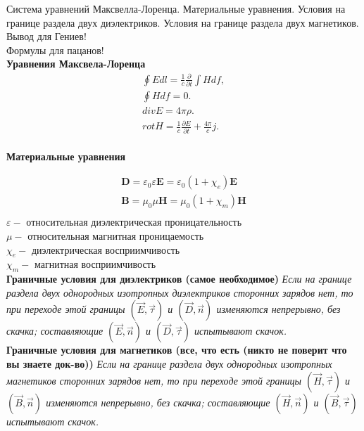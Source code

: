 \documentclass[__main__.tex]{subfiles}
\begin{document}
Система уравнений Максвелла-Лоренца. Материальные уравнения. Условия на границе раздела двух диэлектриков. Условия на границе раздела двух магнетиков.\\ 

Вывод для Гениев!\\
Формулы для пацанов!\\

\textbf{Уравнения Максвела-Лоренца}
\begin{gather*}
\oint Edl = \frac{1}{c}\frac{\partial}{\partial t}\int Hdf,\\
\oint H df = 0.\\
div E = 4\pi\rho.\\
rot H = \frac{1}{c}\frac{\partial E}{\partial t} + \frac{4\pi}{c}j.\\
\end{gather*}

\textbf{Материальные уравнения}

\begin{gather*}
\mathbf {D} =\varepsilon _{0}\varepsilon \mathbf {E} =\varepsilon _{0}(1+\chi _{e})\mathbf {E} \\
\mathbf {B} =\mu _{0}\mu \mathbf {H} =\mu _{0}(1+\chi _{m})\mathbf {H} \\
\end{gather*}
$\varepsilon-$ относительная диэлектрическая проницательность\\
$\mu-$ относительная магнитная проницаемость\\
$\chi _{e}-$ диэлектрическая восприимчивость\\
$\chi _{m}-$ магнитная восприимчивость\\

\textbf{Граничные условия для диэлектриков (самое необходимое)} \emph{Если на границе раздела двух однородных изотропных диэлектриков сторонних зарядов нет, то при переходе этой границы $(\vec{E},\vec{\tau})$ и $(\vec{D},\vec{n})$ изменяются непрерывно, без скачка; составляющие $(\vec{E},\vec{n})$ и $(\vec{D},\vec{\tau})$ испытывают скачок.}\\

\textbf{Граничные условия для магнетиков (все, что есть (никто не поверит что вы знаете док-во))} \emph{Если на границе раздела двух однородных изотропных магнетиков сторонних зарядов нет, то при переходе этой границы $(\vec{H},\vec{\tau})$ и $(\vec{B},\vec{n})$ изменяются непрерывно, без скачка; составляющие $(\vec{H},\vec{n})$ и $(\vec{B},\vec{\tau})$ испытывают скачок.}\\
\end{document}
